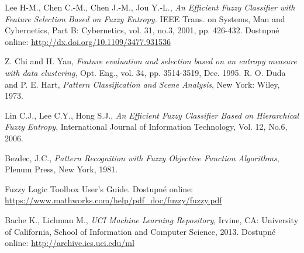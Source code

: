 \begin{thebibliography}{}
 Lee H-M., Chen C.-M., Chen J.-M., Jou Y.-L., \textit{An Efficient Fuzzy Classifier with Feature Selection Based on Fuzzy Entropy.} IEEE Trans. on Systems, Man and Cybernetics, Part B: Cybernetics, vol. 31, no.3, 2001, pp. 426-432. Dostupné online: \url{http://dx.doi.org/10.1109/3477.931536}

 Z. Chi and H. Yan, \textit{Feature evaluation and selection based on an entropy measure with data clustering}, Opt. Eng., vol. 34, pp. 3514-3519, Dec. 1995. 
 R. O. Duda and P. E. Hart, \textit{Pattern Classification and Scene Analysis}, New York: Wiley, 1973. 

 Lin C.J., Lee C.Y., Hong S.J., \textit{An Efficient Fuzzy Classifier Based on Hierarchical Fuzzy Entropy}, International Journal of Information Technology, Vol. 12, No.6, 2006.  

 Bezdec, J.C., {\it Pattern Recognition with Fuzzy Objective Function Algorithms}, Plenum
Press, New York, 1981.

 Fuzzy Logic Toolbox User's Guide. Dostupné online: \url{https://www.mathworks.com/help/pdf_doc/fuzzy/fuzzy.pdf}

 Bache K., Lichman M., \textit{UCI Machine Learning Repository}, Irvine, CA: University of California, School of Information and Computer Science, 2013. Dostupné online: \url{http://archive.ics.uci.edu/ml}

        
\end{thebibliography}

